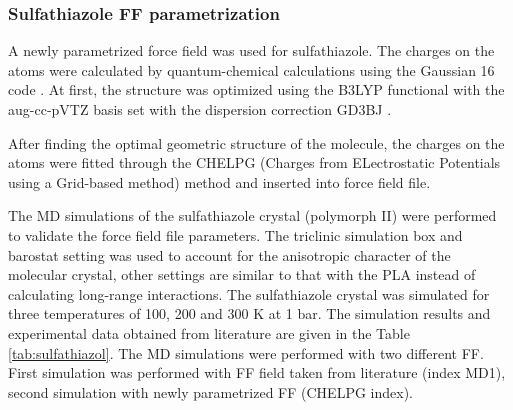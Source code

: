 \subsubsection{Sulfathiazole FF parametrization}
A newly parametrized force field \cite{jorgensen_development_1996} was used for sulfathiazole. The charges on the atoms were calculated by quantum-chemical calculations using the Gaussian 16 code \cite{frisch_gaussian16_2016}. At first, the structure was optimized using the B3LYP functional with the aug-cc-pVTZ basis set with the dispersion correction GD3BJ \cite{smith_revised_2016}.

 After finding the optimal geometric structure of the molecule, the charges on the atoms were fitted through the CHELPG (Charges from ELectrostatic Potentials using a Grid-based method)\cite{breneman_determining_1990} method and inserted into force field file.

The MD simulations of the sulfathiazole crystal (polymorph II) were performed to validate the force field file parameters. The triclinic simulation box and barostat setting was used to account for the anisotropic character of the molecular crystal, other settings are similar to that with the PLA instead of calculating long-range interactions. The sulfathiazole crystal was simulated for three temperatures of 100, 200 and 300 K at 1 bar. The simulation results and experimental data obtained from literature \cite{drebushchak_crystal_2008} are given in the Table \ref{tab:sulfathiazol}. The MD simulations were performed with two different FF. First simulation was performed with FF field taken from literature (index MD1), second simulation with newly parametrized FF (CHELPG index). 

